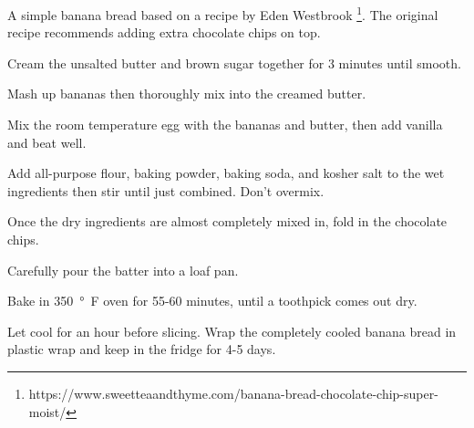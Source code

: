 
A simple banana bread based on a recipe by Eden Westbrook \footnote{https://www.sweetteaandthyme.com/banana-bread-chocolate-chip-super-moist/}. The original recipe recommends adding extra chocolate chips on top.


Cream the unsalted butter and brown sugar together for 3 minutes until smooth.

\begin{ingredients}
\end{ingredients}

Mash up bananas then thoroughly mix into the creamed butter.

\begin{ingredients}
\end{ingredients}

Mix the room temperature egg with the bananas and butter, then add vanilla and beat well.

\begin{ingredients}
\end{ingredients}

Add all-purpose flour, baking powder, baking soda, and kosher salt to the wet ingredients then stir until just combined. Don't overmix.

\begin{ingredients}
\end{ingredients}

Once the dry ingredients are almost completely mixed in, fold in the chocolate chips.

\begin{ingredients}
\end{ingredients}

Carefully pour the batter into a loaf pan.

Bake in \SI{350}{°F} oven for 55-60 minutes, until a toothpick comes out dry.

Let cool for an hour before slicing. Wrap the completely cooled banana bread in plastic wrap and keep in the fridge for 4-5 days.
